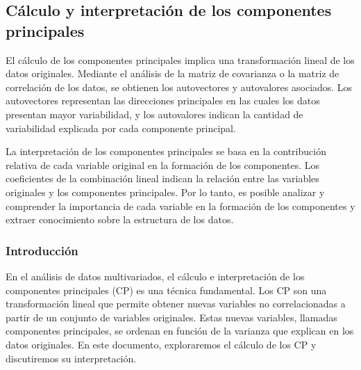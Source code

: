 \documentclass{article}
\begin{document}

\subsection{Cálculo y interpretación de los componentes principales}
El cálculo de los componentes principales implica una transformación lineal de los datos originales. Mediante el análisis de la matriz de covarianza o la matriz de correlación de los datos, se obtienen los autovectores y autovalores asociados. Los autovectores representan las direcciones principales en las cuales los datos presentan mayor variabilidad, y los autovalores indican la cantidad de variabilidad explicada por cada componente principal.

La interpretación de los componentes principales se basa en la contribución relativa de cada variable original en la formación de los componentes. Los coeficientes de la combinación lineal indican la relación entre las variables originales y los componentes principales. Por lo tanto, es posible analizar y comprender la importancia de cada variable en la formación de los componentes y extraer conocimiento sobre la estructura de los datos.

\subsubsection{Introducción}
En el análisis de datos multivariados, el cálculo e interpretación de los componentes principales (CP) es una técnica fundamental. Los CP son una transformación lineal que permite obtener nuevas variables no correlacionadas a partir de un conjunto de variables originales. Estas nuevas variables, llamadas componentes principales, se ordenan en función de la varianza que explican en los datos originales. En este documento, exploraremos el cálculo de los CP y discutiremos su interpretación.

\end{document}

